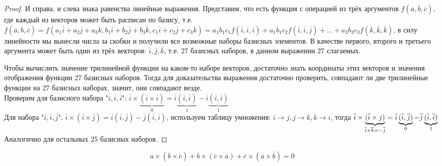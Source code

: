 	\begin{proof}
		И справа, и слева знака равенства линейные выражения. Представим, что есть функция с операцией из трёх аргументов $f(\overline{a}, \overline{b}, \overline{c})$, где каждый из векторов может быть расписан по базису, т.е. $f(\overline{a}, \overline{b}, \overline{c}) = f(a_1 \overline{i} + a_2 \overline{j} +a_3 \overline{k}, b_1 \overline{i} + b_2 \overline{j} + b_3 \overline{k}, c_1 \overline{i} + c_2 \overline{j} + c_3 \overline{k})
		= a_1 b_1 c_1 f(\overline{i}, \overline{i}, \overline{i}) + a_1 b_1 c_2 f(\overline{i}, \overline{i}, \overline{j}) + ... + a_3 b_3 c_3 f(\overline{k}, \overline{k}, \overline{k})$, в силу линейности мы вынесли числа за скобки и получили все возможные наборы базисных элементов. В качестве первого, второго и третьего аргумента может быть один из трёх векторов: $\overline{i}, \overline{j}, \overline{k}$, т.е. 27 базисных наборов, в данном выражении 27 слагаемых. 

		Чтобы вычислить значение трилинейной функции на каком-то наборе векторов, достаточно знать координаты этих векторов и значения отображения функции 27 базисных наборов.
		Тогда для доказательства выражения достаточно проверить, совпадают ли две трилинейные функции на 27 базисных наборах, значит, они совпадают везде.\\
		Проверим для базисного набора "$\overline{i}, \overline{i}, \overline{i}$": $\overline{i} \times \underbrace{(\overline{i} \times \overline{i})}_{0} = \overline{i} \underbrace{(\overline{i}, \overline{i})}_{1} - \overline{i}\underbrace{(\overline{i}, \overline{i})}_{1}$\\
		Для набора "$\overline{i}, \overline{i}, \overline{j}$": $\overline{i} \times (\overline{i} \times \overline{j}) = \overline{i}(\overline{i}, \overline{j}) - \overline{j}(\overline{i}, \overline{i})$, используем таблицу умножения: $i \to j, j \to k, k \to i$, тогда $\overline{i} \times \underbrace{(\overline{i} \times j)}_{\overline{i} \times \overline{k} = - \overline{j} } = \overline{i}\underbrace{(\overline{i}, \overline{j})}_0 - \overline{j}\underbrace{(\overline{i}, \overline{i})}_1\\$
		Аналогично для остальных 25 базисных наборов.
	\end{proof}

	\begin{Thm}
		$$\overline{a} \times (\overline{b} \times \overline{c}) + \overline{b}\times(\overline{c} \times \overline{a}) + \overline{c} \times (\overline{a}\times \overline{b}) = 0$$
	\end{Thm}

